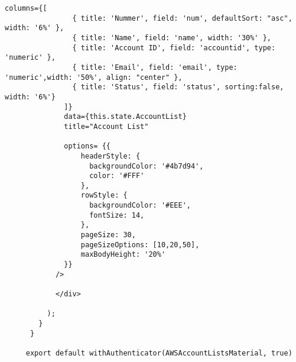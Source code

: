 \begin{lstlisting}[caption={React AccountsList.js},
label=lst:React AccountList,basicstyle=\ttfamily\small ]
              columns={[
                { title: 'Nummer', field: 'num', defaultSort: "asc", width: '6%' },
                { title: 'Name', field: 'name', width: '30%' },
                { title: 'Account ID', field: 'accountid', type: 'numeric' },
                { title: 'Email', field: 'email', type: 'numeric',width: '50%', align: "center" },
                { title: 'Status', field: 'status', sorting:false, width: '6%'}
              ]}
              data={this.state.AccountList}
              title="Account List"

              options= {{
                  headerStyle: {
                    backgroundColor: '#4b7d94',
                    color: '#FFF'
                  },
                  rowStyle: {
                    backgroundColor: '#EEE',
                    fontSize: 14,
                  },
                  pageSize: 30,
                  pageSizeOptions: [10,20,50],
                  maxBodyHeight: '20%'
              }}
            />

            </div>

          );
        }
      }

     export default withAuthenticator(AWSAccountListsMaterial, true)


\end{lstlisting}
